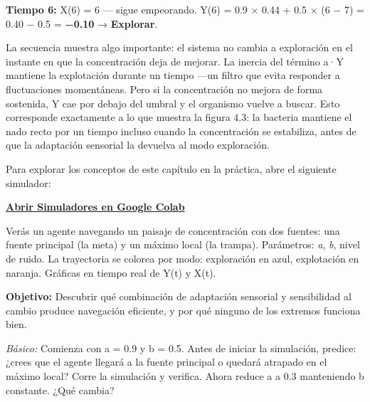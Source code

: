 \documentclass[
  letterpaper,
  DIV=11,
  numbers=noendperiod]{scrreprt}
\begin{document}
\textbf{Tiempo 6:} X(6) = 6 --- sigue empeorando. Y(6) = 0.9 × 0.44 +
0.5 × (6 − 7) = 0.40 − 0.5 = \textbf{−0.10} → \textbf{Explorar}.

La secuencia muestra algo importante: el sistema no cambia a exploración
en el instante en que la concentración deja de mejorar. La inercia del
término a·Y mantiene la explotación durante un tiempo ---un filtro que
evita responder a fluctuaciones momentáneas. Pero si la concentración no
mejora de forma sostenida, Y cae por debajo del umbral y el organismo
vuelve a buscar. Esto corresponde exactamente a lo que muestra la figura
4.3: la bacteria mantiene el nado recto por un tiempo incluso cuando la
concentración se estabiliza, antes de que la adaptación sensorial la
devuelva al modo exploración.

\begin{tcolorbox}[enhanced jigsaw, arc=.35mm, bottomrule=.15mm, bottomtitle=1mm, breakable, colback=white, colbacktitle=quarto-callout-tip-color!10!white, colframe=quarto-callout-tip-color-frame, coltitle=black, left=2mm, leftrule=.75mm, opacityback=0, opacitybacktitle=0.6, rightrule=.15mm, title=\textcolor{quarto-callout-tip-color}{\faLightbulb}\hspace{0.5em}{🕹️ ¡Prueba el Simulador Interactivo!}, titlerule=0mm, toprule=.15mm, toptitle=1mm]

Para explorar los conceptos de este capítulo en la práctica, abre el
siguiente simulador:

\href{https://colab.research.google.com/github/arbouria/Libro-ACA-2026/blob/main/Simuladores/ascenso_colina.ipynb}{\textbf{Abrir
Simuladores en Google Colab}}

\end{tcolorbox}

Verás un agente navegando un paisaje de concentración con dos fuentes:
una fuente principal (la meta) y un máximo local (la trampa).
Parámetros: \emph{a}, \emph{b}, nivel de ruido. La trayectoria se
colorea por modo: exploración en azul, explotación en naranja. Gráficas
en tiempo real de Y(t) y X(t).

\textbf{Objetivo:} Descubrir qué combinación de adaptación sensorial y
sensibilidad al cambio produce navegación eficiente, y por qué ninguno
de los extremos funciona bien.

\emph{Básico:} Comienza con a = 0.9 y b = 0.5. Antes de iniciar la
simulación, predice: ¿crees que el agente llegará a la fuente principal
o quedará atrapado en el máximo local? Corre la simulación y verifica.
Ahora reduce a a 0.3 manteniendo b constante. ¿Qué cambia?
\end{document}

